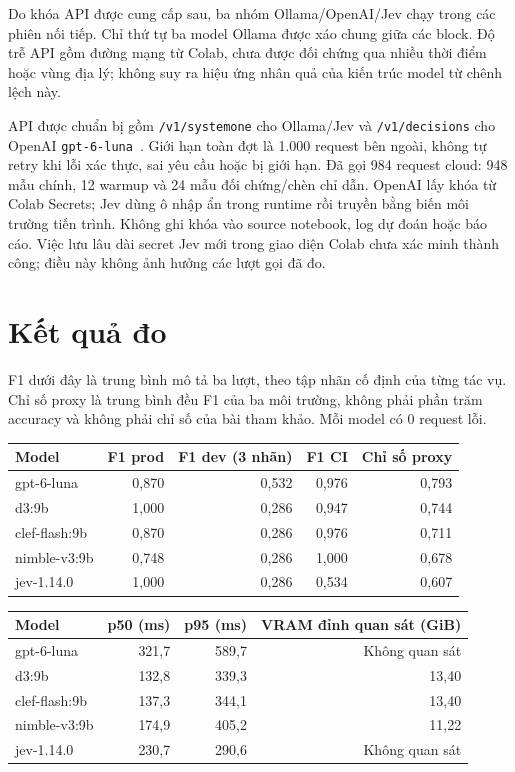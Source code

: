 \documentclass[11pt,a4paper]{article}
\begin{document}
Do khóa API được cung cấp sau, ba nhóm Ollama/OpenAI/Jev chạy trong các phiên nối tiếp.
Chỉ thứ tự ba model Ollama được xáo chung giữa các block. Độ trễ API gồm đường mạng
từ Colab, chưa được đối chứng qua nhiều thời điểm hoặc vùng địa lý; không suy ra
hiệu ứng nhân quả của kiến trúc model từ chênh lệch này.

API được chuẩn bị gồm \texttt{/v1/systemone} cho Ollama/Jev và
\texttt{/v1/decisions} cho OpenAI \texttt{gpt-6-luna}~\cite{ollama,jev,openai}.
Giới hạn toàn đợt là 1.000 request bên ngoài, không tự retry khi lỗi xác thực,
sai yêu cầu hoặc bị giới hạn. Đã gọi 984 request cloud: 948 mẫu chính, 12 warmup và
24 mẫu đối chứng/chèn chỉ dẫn. OpenAI lấy khóa từ Colab Secrets; Jev dùng ô nhập ẩn
trong runtime rồi truyền bằng biến môi trường tiến trình. Không ghi khóa vào source
notebook, log dự đoán hoặc báo cáo. Việc lưu lâu dài secret Jev mới trong giao diện
Colab chưa xác minh thành công; điều này không ảnh hưởng các lượt gọi đã đo.

\section{Kết quả đo}
F1 dưới đây là trung bình mô tả ba lượt, theo tập nhãn cố định của từng tác vụ.
Chỉ số proxy là trung bình đều F1 của ba môi trường, không phải phần trăm accuracy
và không phải chỉ số của bài tham khảo. Mỗi model có 0 request lỗi.

\begin{center}\small
\begin{tabular}{lrrrr}
\toprule
Model & F1 prod & F1 dev (3 nhãn) & F1 CI & Chỉ số proxy\\
\midrule
gpt-6-luna & 0,870 & 0,532 & 0,976 & 0,793\\
d3:9b & 1,000 & 0,286 & 0,947 & 0,744\\
clef-flash:9b & 0,870 & 0,286 & 0,976 & 0,711\\
nimble-v3:9b & 0,748 & 0,286 & 1,000 & 0,678\\
jev-1.14.0 & 1,000 & 0,286 & 0,534 & 0,607\\
\bottomrule
\end{tabular}

\medskip
\begin{tabular}{lrrr}
\toprule
Model & p50 (ms) & p95 (ms) & VRAM đỉnh quan sát (GiB)\\
\midrule
gpt-6-luna & 321,7 & 589,7 & Không quan sát\\
d3:9b & 132,8 & 339,3 & 13,40\\
clef-flash:9b & 137,3 & 344,1 & 13,40\\
nimble-v3:9b & 174,9 & 405,2 & 11,22\\
jev-1.14.0 & 230,7 & 290,6 & Không quan sát\\
\bottomrule
\end{tabular}
\end{center}
\end{document}
